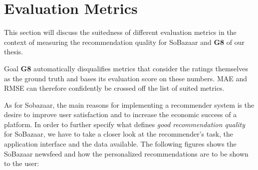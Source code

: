 \section{Evaluation Metrics}
\label{sec:eval-metrics}


This section will discuss the suitedness of different evaluation metrics in the context
of measuring the recommendation quality for SoBazaar and \textbf{G8} of our thesis.

Goal \textbf{G8} automatically disqualifies metrics that consider the ratings themselves as the
ground truth and bases its evaluation score on these numbers. MAE and RMSE can therefore
confidently be crossed off the list of suited metrics.

As for Sobazaar, the main reasons for implementing a recommender system is the desire to improve user
satisfaction and to increase the economic success of a platform. In order to further specify what
defines \emph{good recommendation quality} for SoBazaar, we have to take a closer look at the
recommender's task, the application interface and the data available. The following figures
shows the SoBazaar newsfeed and how the personalized recommendations are to be shown to the user:

